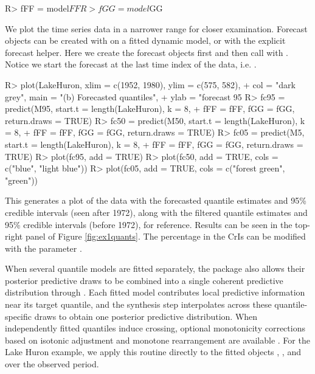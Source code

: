 \documentclass{jss}
\begin{document}
\begin{CodeChunk}
\begin{CodeInput}
R> fFF = model$FF
R> fGG =  model$GG
\end{CodeInput}
\end{CodeChunk}

We plot the time series data in a narrower range for closer examination. Forecast objects can be created with  on a fitted dynamic model, or with the explicit forecast helper. Here we create the forecast objects first and then call  with . Notice we start the forecast at the last time index of the data, i.e. .

\begin{CodeChunk}
\begin{CodeInput}
R> plot(LakeHuron,  xlim = c(1952, 1980), ylim = c(575, 582),
+        col = "dark grey", main = "(b) Forecasted quantiles",
+           ylab = "forecast 95%
R> fc95 = predict(M95, start.t = length(LakeHuron), k = 8,
+                fFF = fFF, fGG = fGG, return.draws = TRUE)
R> fc50 = predict(M50, start.t = length(LakeHuron), k = 8,
+                fFF = fFF, fGG = fGG, return.draws = TRUE)
R> fc05 = predict(M5, start.t = length(LakeHuron), k = 8,
+                fFF = fFF, fGG = fGG, return.draws = TRUE)
R> plot(fc95, add = TRUE)
R> plot(fc50, add = TRUE, cols = c("blue", "light blue"))
R> plot(fc05, add = TRUE, cols = c("forest green", "green"))
\end{CodeInput}
\end{CodeChunk}

This generates a plot of the data with the forecasted quantile estimates and 95\% credible intervals (seen after 1972), along with the filtered quantile estimates and 95\% credible intervals (before 1972), for reference. Results can be seen in the top-right panel of Figure \ref{fig:ex1quants}. The percentage in the CrIs can be modified with the parameter .

When several quantile models are fitted separately, the package also allows their posterior predictive draws to be combined into a single coherent predictive distribution through . Each fitted model contributes local predictive information near its target quantile, and the synthesis step interpolates across these quantile-specific draws to obtain one posterior predictive distribution. When independently fitted quantiles induce crossing, optional monotonicity corrections based on isotonic adjustment and monotone rearrangement are available \citep{barlow1972,chernozhukov2010}. For the Lake Huron example, we apply this routine directly to the fitted objects , , and  over the observed period.
\end{document}
